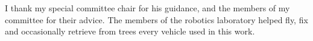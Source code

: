 I thank my special committee chair for his guidance, and the members of my committee for
their advice. The members of the robotics laboratory helped fly, fix and occasionally retrieve
from trees every vehicle used in this work.
